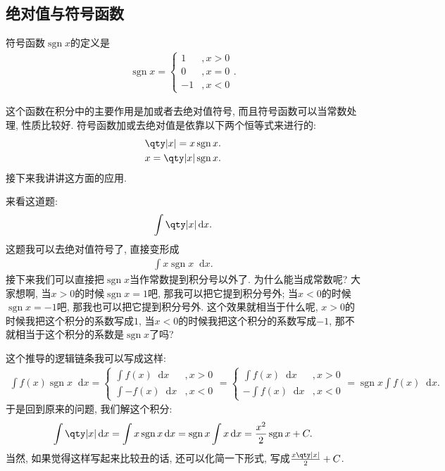 \documentclass{ctexbook}
\DeclareMathOperator{\sgn}{sgn}
\newcommand*{\dif}{\mathop{}\!\mathrm{d}}
\begin{document}
{\subsection{绝对值与符号函数}
符号函数$\sgn{x}$的定义是
{
\setlength{\parskip}{0.4em}
\begin{align*}
\sgn{x}=\begin{cases}
1&,x>0\\
0&,x=0\\
-1&,x<0
\end{cases}
.\end{align*}
}\par
这个函数在积分中的主要作用是加或者去绝对值符号, 而且符号函数可以当常数处理, 性质比较好. 符号函数加或去绝对值是依靠以下两个恒等式来进行的: 
\begin{align*}
\qty|x|=x\sgn{x}.\\
x=\qty|x|\sgn{x}
.\end{align*}
接下来我讲讲这方面的应用. \par
来看这道题: 
\begin{align*}
\int\qty|x|\dif{x}
.\end{align*}
这题我可以去绝对值符号了, 直接变形成
\begin{align*}
\int x\sgn{x}\dif{x}
.\end{align*}
接下来我们可以直接把$\sgn{x}$当作常数提到积分号以外了. 为什么能当成常数呢? 大家想啊, 当$x>0$的时候$\sgn{x}=1$吧, 那我可以把它提到积分号外; 当$x<0$的时候$\sgn{x}=-1$吧, 那我也可以把它提到积分号外. 这个效果就相当于什么呢, $x>0$的时候我把这个积分的系数写成$1$, 当$x<0$的时候我把这个积分的系数写成$-1$, 那不就相当于这个积分的系数是$\sgn{x}$了吗? \par
这个推导的逻辑链条我可以写成这样: 
\begin{align*}
\int f(x)\sgn{x}\dif{x}=\begin{cases}
\int f(x)\dif{x}&,x>0\\
\int -f(x)\dif{x}&,x<0
\end{cases}=\begin{cases}
\int f(x)\dif{x}&,x>0\\
-\int f(x)\dif{x}&,x<0
\end{cases}=\sgn{x}\int f(x)\dif{x}
.\end{align*}
于是回到原来的问题, 我们解这个积分: 
\begin{align*}
\int\qty|x|\dif{x}=\int x\sgn{x}\dif{x}=\sgn{x}\int x\dif{x}=\frac{x^{2}}{2}\sgn{x}+C
.\end{align*}
当然, 如果觉得这样写起来比较丑的话, 还可以化简一下形式, 写成$\frac{x\qty|x|}{2}+C$. \par
}
\end{document}
